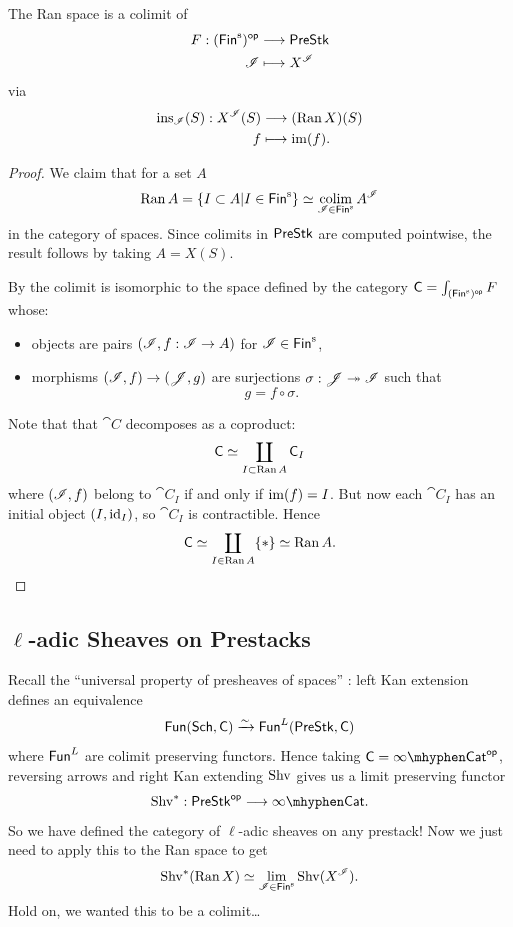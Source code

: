 \documentclass[oneside]{amsart}
\begin{document}
\begin{proposition}\label{prop:rancolim}
	The Ran space is a colimit of
	\begin{align*}
		F: (\Fins)\op &\longrightarrow \PreStk \\
		\CI &\longmapsto X^{\CI}
	\end{align*}
	via
	\begin{align*}
		\operatorname{ins}_{\mathscr{I}}(S): X^{\mathscr{I}}(S) &\longrightarrow (\operatorname{Ran} X)(S) \\
		f &\longmapsto \operatorname{im}(f).
	\end{align*}
\end{proposition}
\begin{proof}
	We claim that for a set $A$
	\[
	\Ran A = \left\{ I\subset A \middle| I\in \Fins \right\} \isoto \colim_{\CI\in \Fins}A^{\CI}
	\] 
	in the category of spaces. Since colimits in $\mathsf{PreStk}$ are computed pointwise, the result follows by taking $A=X(S)$.

	By \cite[\href{https://kerodon.net/tag/02VF}{Tag 02VF}]{kerodon} the colimit is isomorphic to the space defined by the category $\cat{C}=\int_{(\Fins)\op} F$ whose:
	\begin{itemize}
		\item objects are pairs $(\CI,f:\CI\to A)$ for $\CI\in \Fins$,
		\item morphisms $(\CI,f)\to (\CJ,g)$ are surjections $\sigma:\mathscr{J}\twoheadrightarrow \mathscr{I}$ such that
			\[
			g = f\circ\sigma.
			\] 
	\end{itemize}
	Note that that $\cat{C}$ decomposes as a coproduct:
	\[
		\mathsf{C} \simeq \coprod_{I\subset \operatorname{Ran} A}\mathsf{C}_I
	\] 
	where $(\mathscr{I},f)$ belong to $\cat{C}_I$ if and only if $\operatorname{im}(f) = I$. But now each $\cat{C}_I$ has an initial object $(I,\operatorname{id}_I)$, so $\cat{C}_I$ is contractible. Hence
	\[
		\mathsf{C} \simeq \coprod_{I\in \operatorname{Ran} A} \{*\} \simeq \operatorname{Ran} A.
	\] 
\end{proof}

\subsection{\texorpdfstring{$\ell$-adic Sheaves on Prestacks}{l-adic Sheaves on Prestacks}}
Recall the ``universal property of presheaves of spaces'' \cite[\href{https://kerodon.net/tag/03WH}{Tag 03WH}]{kerodon}: left Kan extension defines an equivalence
\[
	\mathsf{Fun}(\mathsf{Sch},\mathsf{C}) \xrightarrow{\sim} \mathsf{Fun}^{L}(\mathsf{PreStk},\mathsf{C})
\] 
where $\mathsf{Fun}^{L}$ are colimit preserving functors. Hence taking $\cat{C}=\iCat\op$, reversing arrows and right Kan extending $\operatorname{Shv}$ gives us a limit preserving functor
\[
\Shv^{*}:\PreStk\op \to \iCat.
\] 
So we have defined the category of $\ell$-adic sheaves on any prestack! Now we just need to apply this to the Ran space to get
\[
\Shv^{*}(\Ran X) \isoto \lim_{\CI\in \Fins} \Shv(X^{\CI}).
\] 
Hold on, we wanted this to be a colimit\dots
\end{document}
